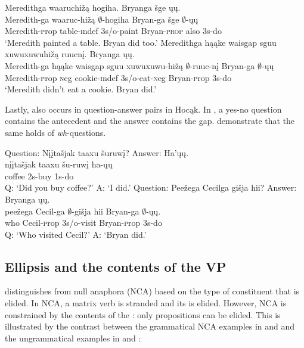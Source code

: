 \documentclass[output=paper]{LSP/langsci}
\begin{document}
\ea\label{ex:johnson:27}
\ea 
\glll Meredithga waaruchižą hogiha. Bryanga šge ųų.\\
Meredith-ga waaruc-hižą $\emptyset$-hogiha Bryan-ga šge $\emptyset$-ųų\\
Meredith-{\textsc prop} table-{\textsc indef} {\textsc 3s/o}-paint Bryan-\textsc{prop} also {\textsc 3s}-do\\
\trans `Meredith painted a table. Bryan did too.'
\ex 
\glll Meredithga hąąke {waisgap sguu xuwuxuwuhižą} ruucnį. Bryanga ųų.\\
Meredith-ga hąąke {waisgap sguu xuwuxuwu-hižą} $\emptyset$-ruuc-nį Bryan-ga $\emptyset$-ųų\\
Meredith-{\textsc prop} {\textsc neg} cookie-{\textsc indef} {\textsc 3s/o}-eat-{\textsc neg} Bryan-{\textsc prop} {\textsc 3s}-do\\
\trans `Meredith didn't eat a cookie. Bryan did.'
\z
\z

Lastly,  also occurs in question-answer pairs in Hocąk. In , a yes-no question contains the antecedent  and the answer contains the gap.  demonstrate that the same holds of \emph{wh}-questions.
 
\ea\label{ex:johnson:28}
\ea\label{ex:johnson:28a} 
\glll Question: {Nįįtašjak taaxu} šuruwį? Answer: Ha'ųų.\\
{} {nįįtašjak taaxu} šu-ruwį {} ha-ųų\\
{} coffee {\textsc 2s}-buy {} {\textsc 1s}-do\\
 \trans Q: `Did you buy coffee?' A: `I did.' 
\ex\label{ex:johnson:28b} 
\glll Question: Peežega Cecilga {gišja hii}? Answer: Bryanga ųų.\\
{} peežega Cecil-ga $\emptyset$-{gišja hii} {} Bryan-ga $\emptyset$-ųų.\\
{} who Cecil-{\textsc prop} {\textsc 3s/o}-visit {} Bryan-{\textsc prop} {\textsc 3s}-do\\
\trans Q: `Who visited Cecil?' A: `Bryan did.'
\z
\z


\subsection{Ellipsis and the contents of the VP}\label{sec:johnson:3.2}

\citet{Goldberg2005} distinguishes  from null  anaphora (NCA) based on the type of constituent that is elided. In NCA, a matrix verb is stranded and its  is elided. However, NCA is constrained by the contents of the : only propositions can be elided. This is illustrated by the contrast between the grammatical NCA examples in  and  and the ungrammatical examples in  and :
 
\end{document}
